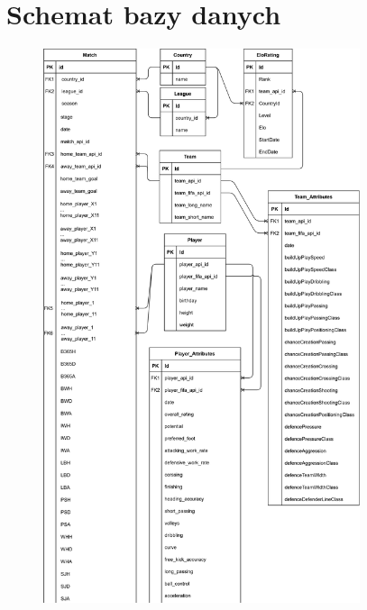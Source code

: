 \section{Schemat bazy danych}
\label{database_schema}
\begin{figure}[h]
  \centering
   \includegraphics[width=0.83\textwidth]{figures/match_predict_schema_1.png}%

\end{figure}
\newpage
